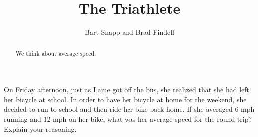 \documentclass[nooutcomes]{ximera}
\title{The Triathlete}
\author{Bart Snapp and Brad Findell}
\begin{document}
\begin{abstract}
  We think about average speed.
\end{abstract}
\maketitle

\label{A:Triathlete}

\begin{problem} 
On Friday afternoon, just as Laine got off the bus, she realized that she had left her bicycle at school.  In order to have her bicycle at home for the weekend, she decided to run to school and then ride her bike back home.  If she averaged 6 mph running and 12 mph on her bike, what was her average speed for the round trip?  Explain your reasoning. 
\end{problem}
\end{document}
